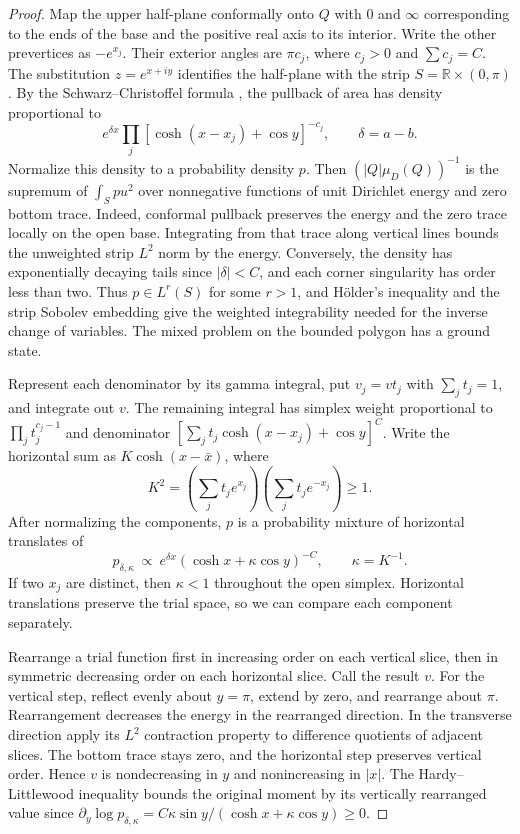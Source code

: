 \documentclass[11pt,a4paper,reqno]{amsart}
\theoremstyle{remark}
\numberwithin{equation}{section}
\newcommand{\R}{\mathbb R}
\begin{document}
\begin{proof}
Map the upper half-plane conformally onto $Q$ with $0$ and $\infty$
corresponding to the ends of the base and the positive real axis to its
interior. Write the other prevertices as $-e^{x_j}$. Their exterior angles
are $\pi c_j$, where $c_j>0$ and $\sum c_j=C$. The substitution
$z=e^{x+iy}$ identifies the half-plane with the strip
$S=\R\times(0,\pi)$. By the Schwarz--Christoffel formula \cite{SC}, the
pullback of area has density proportional to
\[
       e^{\delta x}\prod_j[\cosh(x-x_j)+\cos y]^{-c_j},
       \qquad \delta=a-b .
\]
Normalize this density to a probability density $p$. Then
$(|Q|\mu_D(Q))^{-1}$ is the supremum of $\int_S p u^2$ over nonnegative
functions of unit Dirichlet energy and zero bottom trace. Indeed,
conformal pullback preserves the energy and the zero trace locally on the
open base. Integrating from that trace along vertical lines bounds the
unweighted strip $L^2$ norm by the energy. Conversely, the density has
exponentially decaying tails since $|\delta|<C$, and each corner singularity
has order less than two. Thus $p\in L^r(S)$ for some $r>1$, and
H\"older's inequality and the strip Sobolev embedding give the weighted
integrability needed for the inverse change of variables. The mixed problem
on the bounded polygon has a ground state.

Represent each denominator by its gamma integral, put $v_j=vt_j$ with
$\sum_j t_j=1$, and integrate out $v$. The remaining integral has simplex
weight proportional to $\prod_j t_j^{c_j-1}$ and denominator
$[\sum_jt_j\cosh(x-x_j)+\cos y]^C$. Write the horizontal sum as
$K\cosh(x-\bar x)$, where
\[
 K^2=\left(\sum_jt_je^{x_j}\right)\left(\sum_jt_je^{-x_j}\right)\ge1 .
\]
After normalizing the components, $p$ is a probability mixture of horizontal
translates of
\[
 p_{\delta,\kappa}\ \propto\ e^{\delta x}(\cosh x+\kappa\cos y)^{-C},
 \qquad \kappa=K^{-1}.
\]
If two $x_j$ are distinct, then $\kappa<1$ throughout the open simplex.
Horizontal translations preserve the trial space, so we can compare each
component separately.

Rearrange a trial function first in increasing order on each vertical slice,
then in symmetric decreasing order on each horizontal slice. Call the result
$v$. For the vertical step, reflect evenly about $y=\pi$, extend by zero, and
rearrange about $\pi$. Rearrangement decreases the energy in the rearranged
direction. In the transverse direction apply its $L^2$ contraction property to
difference quotients of adjacent slices. The bottom trace stays zero, and the
horizontal step preserves vertical order. Hence $v$ is nondecreasing in $y$
and nonincreasing in $|x|$. The Hardy--Littlewood inequality bounds the original moment by its vertically
rearranged value since $\partial_y\log p_{\delta,\kappa}
=C\kappa\sin y/(\cosh x+\kappa\cos y)\ge0$.


\end{proof}
\end{document}
